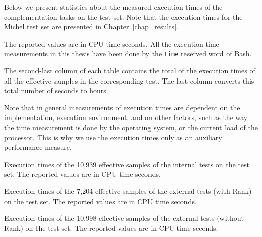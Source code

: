 Below we present statistics about the measured execution times of the complementation tasks on the \goal{} test set. Note that the execution times for the Michel test set are presented in Chapter~\ref{chap_results}.

The reported values are in CPU time seconds. All the execution time measurements in this thesis have been done by the \texttt{time} reserved word of Bash.

The second-last column of each table contains the total of the execution times of all the effective samples in the corresponding test. The last column converts this total number of seconds to hours.

Note that in general measurements of execution times are dependent on the implementation, execution environment, and on other factors, such as the way the time measurement is done by the operating system, or the current load of the processor. This is why we use the execution times only as an auxiliary performance measure.



\vskip0.5cm
\begin{table}[htb]
\centering

\caption{Execution times of the 10,939 effective samples of the internal tests on the \goal{} test set. The reported values are in CPU time seconds.} 
\end{table}
\vskip0.25cm
\begin{table}[htb]
\centering

\caption{Execution times of the 7,204 effective samples of the external tests (with Rank) on the \goal{} test set. The reported values are in CPU time seconds.}
\end{table}

\makeatletter
\setlength{\@fptop}{5pt}
\makeatother

\begin{table}[htb]
\centering

\caption{Execution times of the 10,998 effective samples of the external tests (without Rank) on the \goal{} test set. The reported values are in CPU time seconds.} 
\end{table}
